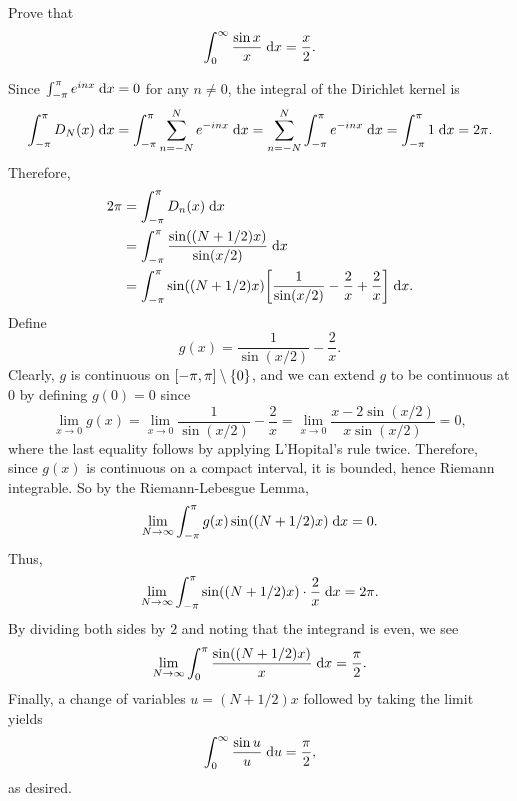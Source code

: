 \begin{exrc}[12]
    Prove that
    \begin{equation*}
        \int_{0}^{\infty} \frac{\sin x}{x} \;\mathrm d x = \frac{x}{2}.
    \end{equation*}

\begin{soln}
    Since \(\int_{-\pi}^{\pi} e^{inx} \;\mathrm d x = 0\) for any \(n \neq 0\),
    the integral of the Dirichlet kernel is
    \begin{equation*}
        \int_{-\pi}^{\pi} D_N(x) \;\mathrm d x
        = \int_{-\pi}^{\pi} \sum_{n = -N}^{N} e^{-inx} \;\mathrm d x
        = \sum_{n = -N}^{N} \int_{-\pi}^{\pi} e^{-inx} \;\mathrm d x
        = \int_{-\pi}^{\pi} 1 \;\mathrm d x
        = 2\pi.
    \end{equation*}
    Therefore,
    \begin{align*}
        2\pi
        &= \int_{-\pi}^{\pi} D_n(x) \ud x \\
        &= \int_{-\pi}^{\pi} \frac{\sin((N + 1 / 2)x)}{\sin(x / 2)} \ud x \\
        &= \int_{-\pi}^{\pi} \sin\br{(N + 1/2)x} \sqbr{\frac{1}{\sin(x/2)}
        - \frac{2}{x} + \frac{2}{x}} \ud x.
    \end{align*}
    Define
    \begin{equation*}
        g(x) = \frac{1}{\sin(x / 2)} - \frac{2}{x}.
    \end{equation*}
    Clearly, \(g\) is continuous on \([-\pi, \pi] \setminus \set{0}\),
    and we can extend \(g\) to be continuous at 0 by defining \(g(0) = 0\) since
    \begin{equation*}
        \lim_{x \to 0} g(x)
        = \lim_{x \to 0} \frac{1}{\sin(x / 2)} - \frac{2}{x}
        = \lim_{x \to 0} \frac{x - 2\sin(x / 2)}{x \sin(x / 2)}
        = 0,
    \end{equation*}
    where the last equality follows by applying L'Hopital's rule twice.
    Therefore, since \(g(x)\) is continuous on a compact interval,
    it is bounded, hence Riemann integrable.
    So by the Riemann-Lebesgue Lemma,
    \begin{equation*}
        \lim_{N \to \infty} \int_{-\pi}^{\pi} g(x) \sin((N + 1 / 2)x) \;\mathrm d x = 0.
    \end{equation*}
    Thus,
    \begin{equation*}
        \lim_{N \to \infty} \int_{-\pi}^{\pi} \sin((N + 1/2)x) \cdot \frac{2}{x} \;\mathrm d x = 2\pi.
    \end{equation*}
    By dividing both sides by \(2\) and noting that the integrand is even, we see
    \begin{equation*}
        \lim_{N \to \infty} \int_{0}^{\pi} \frac{\sin((N + 1/2)x)}{x} \;\mathrm d x = \frac{\pi}{2}.
    \end{equation*}
    Finally, a change of variables \(u = (N + 1/2)x\) followed by taking the limit yields
    \begin{equation*}
        \int_{0}^{\infty} \frac{\sin u}{u} \;\mathrm d u = \frac{\pi}{2},
    \end{equation*}
    as desired.


\end{soln}
\end{exrc}
